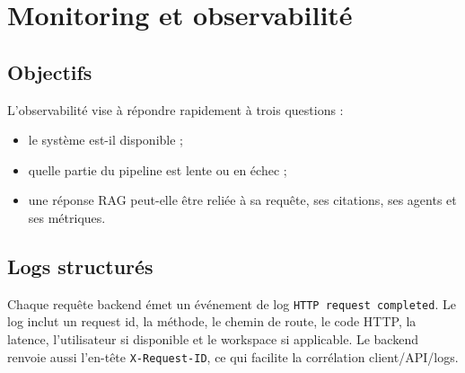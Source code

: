 \documentclass[12pt,a4paper,oneside]{report}
\begin{document}
\chapter{Monitoring et observabilité}

\section{Objectifs}
L'observabilité vise à répondre rapidement à trois questions :
\begin{itemize}
  \item le système est-il disponible ;
  \item quelle partie du pipeline est lente ou en échec ;
  \item une réponse RAG peut-elle être reliée à sa requête, ses citations, ses agents et ses métriques.
\end{itemize}

\section{Logs structurés}
Chaque requête backend émet un événement de log \texttt{HTTP request completed}. Le log inclut un request id, la méthode, le chemin de route, le code HTTP, la latence, l'utilisateur si disponible et le workspace si applicable. Le backend renvoie aussi l'en-tête \texttt{X-Request-ID}, ce qui facilite la corrélation client/API/logs.
\end{document}
